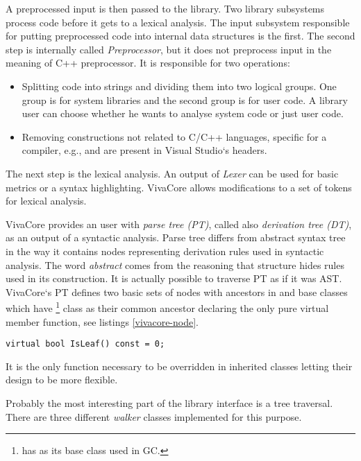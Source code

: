 A preprocessed input is then passed to the library. Two library subsystems process code before it gets to a lexical analysis. The input subsystem responsible for putting preprocessed code into internal data structures is the first. The second step is internally called \emph{Preprocessor}, but it does not preprocess input in the meaning of C++ preprocessor. It is responsible for two operations:

\begin{itemize}
\item Splitting code into strings and dividing them into two logical groups. One group is for system libraries and the second group is for user code. A library user can choose whether he wants to analyse system code or just user code.
\item Removing constructions not related to C/C++ languages, specific for a compiler, e.g.,  and  are present in Visual Studio`s headers.
\end{itemize}

The next step is the lexical analysis. An output of \emph{Lexer} can be used for basic metrics or a syntax highlighting. VivaCore allows modifications to a set of tokens for lexical analysis.

VivaCore provides an user with \emph{parse tree (PT)}, called also \emph{derivation tree (DT)}, as an output of a syntactic analysis. Parse tree differs from abstract syntax tree in the way it contains nodes representing derivation rules used in syntactic analysis. The word \emph{abstract} comes from the reasoning that structure hides rules used in its construction. It is actually possible to traverse PT as if it was AST. VivaCore`s PT defines two basic sets of nodes with ancestors in  and  base classes which have \footnote{ has  as its base class used in GC.} class as their common ancestor declaring the only pure virtual member function, see listings \ref{vivacore-node}.

\begin{lstlisting}[caption={Pure virtual member function of base for VivaCore parse tree node.}, label={vivacore-node}]
virtual bool IsLeaf() const = 0;
\end{lstlisting}

It is the only function necessary to be overridden in inherited classes letting their design to be more flexible.

Probably the most interesting part of the library interface is a tree traversal. There are three different \emph{walker} classes implemented for this purpose.

